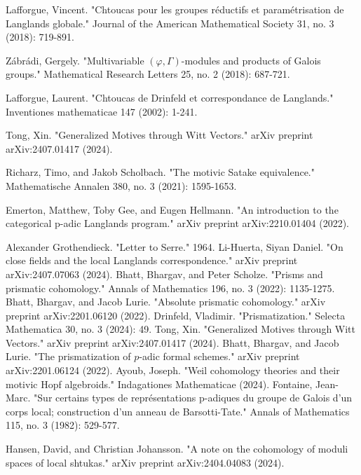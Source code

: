\documentclass[12pt]{article}
\theoremstyle{definition}
\begin{document}
\begin{thebibliography}{}
 Lafforgue, Vincent. "Chtoucas pour les groupes r\'eductifs et param\'etrisation de Langlands globale." Journal of the American Mathematical Society 31, no. 3 (2018): 719-891.

 Z\'abr\'adi, Gergely. "Multivariable $(\varphi,\Gamma) $-modules and products of Galois groups." Mathematical Research Letters 25, no. 2 (2018): 687-721.

 Lafforgue, Laurent. "Chtoucas de Drinfeld et correspondance de Langlands." Inventiones mathematicae 147 (2002): 1-241.

  Tong, Xin. "Generalized Motives through Witt Vectors." arXiv preprint arXiv:2407.01417 (2024).

 Richarz, Timo, and Jakob Scholbach. "The motivic Satake equivalence." Mathematische Annalen 380, no. 3 (2021): 1595-1653.

 Emerton, Matthew, Toby Gee, and Eugen Hellmann. "An introduction to the categorical p-adic Langlands program." arXiv preprint arXiv:2210.01404 (2022).

 Alexander Grothendieck. "Letter to Serre." 1964.
 Li-Huerta, Siyan Daniel. "On close fields and the local Langlands correspondence." arXiv preprint arXiv:2407.07063 (2024).
 Bhatt, Bhargav, and Peter Scholze. "Prisms and prismatic cohomology." Annals of Mathematics 196, no. 3 (2022): 1135-1275.
 Bhatt, Bhargav, and Jacob Lurie. "Absolute prismatic cohomology." arXiv preprint arXiv:2201.06120 (2022).
 Drinfeld, Vladimir. "Prismatization." Selecta Mathematica 30, no. 3 (2024): 49.
 Tong, Xin. "Generalized Motives through Witt Vectors." arXiv preprint arXiv:2407.01417 (2024).
 Bhatt, Bhargav, and Jacob Lurie. "The prismatization of $ p $-adic formal schemes." arXiv preprint arXiv:2201.06124 (2022).
 Ayoub, Joseph. "Weil cohomology theories and their motivic Hopf algebroids." Indagationes Mathematicae (2024).
 Fontaine, Jean-Marc. "Sur certains types de repr\'esentations p-adiques du groupe de Galois d'un corps local; construction d'un anneau de Barsotti-Tate." Annals of Mathematics 115, no. 3 (1982): 529-577.

 Hansen, David, and Christian Johansson. "A note on the cohomology of moduli spaces of local shtukas." arXiv preprint arXiv:2404.04083 (2024).


\end{thebibliography}
\end{document}
